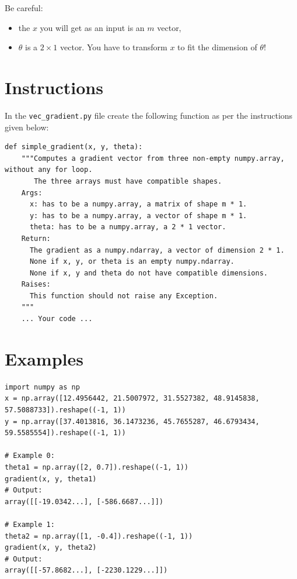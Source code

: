 \documentclass{42-en}
\begin{document}
Be careful:
\begin{itemize}
  \item the $x$ you will get as an input is an $m$ vector,
  \item $\theta$ is a $2 \times 1$ vector. You have to transform $x$ to fit the dimension of $\theta$!
\end{itemize}

\section*{Instructions}
In the \texttt{vec\_gradient.py} file create the following function as per the instructions given below:
\par
\begin{verbatim}
def simple_gradient(x, y, theta):
    """Computes a gradient vector from three non-empty numpy.array, without any for loop.
       The three arrays must have compatible shapes.
    Args:
      x: has to be a numpy.array, a matrix of shape m * 1.
      y: has to be a numpy.array, a vector of shape m * 1.
      theta: has to be a numpy.array, a 2 * 1 vector.
    Return:
      The gradient as a numpy.ndarray, a vector of dimension 2 * 1.
      None if x, y, or theta is an empty numpy.ndarray.
      None if x, y and theta do not have compatible dimensions.
    Raises:
      This function should not raise any Exception.
    """
    ... Your code ...
\end{verbatim}

\section*{Examples}

\begin{verbatim}
import numpy as np
x = np.array([12.4956442, 21.5007972, 31.5527382, 48.9145838, 57.5088733]).reshape((-1, 1))
y = np.array([37.4013816, 36.1473236, 45.7655287, 46.6793434, 59.5585554]).reshape((-1, 1))

# Example 0:
theta1 = np.array([2, 0.7]).reshape((-1, 1))
gradient(x, y, theta1)
# Output:
array([[-19.0342...], [-586.6687...]])

# Example 1:
theta2 = np.array([1, -0.4]).reshape((-1, 1))
gradient(x, y, theta2)
# Output:
array([[-57.8682...], [-2230.1229...]])
\end{verbatim}
\end{document}
